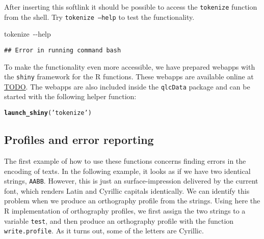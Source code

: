 \documentclass[output=inprep,
		biblatex
		]{LSP/langsci}\usepackage[]{graphicx}\usepackage[]{color}
\makeatletter
\newcommand{\hlstr}[1]{\textcolor[rgb]{0.192,0.494,0.8}{#1}}%
\newcommand{\hlstd}[1]{\textcolor[rgb]{0.345,0.345,0.345}{#1}}%
\newcommand{\hlkwb}[1]{\textcolor[rgb]{0.69,0.353,0.396}{#1}}%
\newcommand{\hlkwd}[1]{\textcolor[rgb]{0.737,0.353,0.396}{\textbf{#1}}}%
\newenvironment{kframe}{%
 \def\at@end@of@kframe{}%
 \ifinner\ifhmode%
  \def\at@end@of@kframe{\end{minipage}}%
  \begin{minipage}{\columnwidth}%
 \fi\fi%
 \def\FrameCommand##1{\hskip\@totalleftmargin \hskip-\fboxsep
 \colorbox{shadecolor}{##1}\hskip-\fboxsep
     \hskip-\linewidth \hskip-\@totalleftmargin \hskip\columnwidth}%
 \MakeFramed {\advance\hsize-\width
   \@totalleftmargin\z@ \linewidth\hsize
   \@setminipage}}%
 {\par\unskip\endMakeFramed%
 \at@end@of@kframe}
\newenvironment{knitrout}{}{} %
\makeatother
\begin{document}
After inserting this softlink it should be possible to access the
\texttt{tokenize} function from the shell. Try \texttt{tokenize --help} to test
the functionality.

\begin{knitrout}\scriptsize
{}\color{fgcolor}\begin{kframe}
\noindent
\ttfamily
\hlstd{tokenize\ }\hlkwb{{-}{-}help}\hlstd{}\hspace*{\fill}
\mbox{}
\normalfont

\begin{verbatim}
## Error in running command bash
\end{verbatim}
\end{kframe}
\end{knitrout}

To make the functionality even more accessible, we have prepared webapps with 
the \texttt{shiny} framework for the R functions. These webapps are available 
online at \url{TODO}. The webapps are also included inside the \texttt{qlcData} 
package and can be started with the following helper function:

\begin{knitrout}\footnotesize
{}\color{fgcolor}\begin{kframe}
\begin{alltt}
\hlkwd{launch_shiny}\hlstd{(}\hlstr{'tokenize'}\hlstd{)}
\end{alltt}
\end{kframe}
\end{knitrout}


\subsection*{Profiles and error reporting}
\label{error-reporting}

The first example of how to use these functions concerns finding errors in the
encoding of texts. In the following example, it looks as if we have two
identical strings, \texttt{AABB}. However, this is just an surface-impression
delivered by the current font, which renders Latin and Cyrillic capitals
identically. We can identify this problem when we produce an orthography profile
from the strings. Using here the R implementation of orthography profiles, we
first assign the two strings to a variable \texttt{test}, and then produce an
orthography profile with the function \texttt{write.profile}. As it turns out,
some of the letters are Cyrillic.
\end{document}
